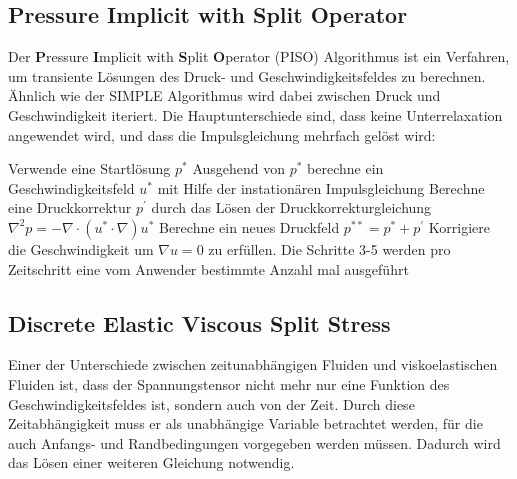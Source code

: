 \subsection{Pressure Implicit with Split Operator}
Der \textbf{P}ressure \textbf{I}mplicit with \textbf{S}plit \textbf{O}perator (PISO)  Algorithmus ist ein Verfahren, um transiente Lösungen des Druck- und Geschwindigkeitsfeldes zu berechnen.\\
Ähnlich wie der \mbox{SIMPLE} Algorithmus wird dabei zwischen Druck und Geschwindigkeit iteriert. Die Hauptunterschiede sind, dass keine Unterrelaxation angewendet wird, und dass die Impulsgleichung mehrfach gelöst wird:
\begin{outline}[enumerate]
    \1 Verwende eine Startlösung $p^*$
    \1 Ausgehend von $p^*$ berechne ein Geschwindigkeitsfeld $u^*$ mit Hilfe der instationären Impulsgleichung
    \1 Berechne eine Druckkorrektur $p^{'}$ durch das Lösen der Druckkorrekturgleichung $\nabla^2p=-\nabla \cdot \left( u^*\cdot\nabla \right)u^*$
    \1 Berechne ein neues Druckfeld $p^{**}=p^*+ p^{'}$
    \1 Korrigiere die Geschwindigkeit um $\nabla u=0$ zu erfüllen.
    \1 Die Schritte 3-5 werden pro Zeitschritt eine vom Anwender bestimmte Anzahl mal ausgeführt
\end{outline}

\subsection{Discrete Elastic Viscous Split Stress}
Einer der Unterschiede zwischen zeitunabhängigen Fluiden und viskoelastischen Fluiden ist, dass der Spannungstensor nicht mehr nur eine Funktion des Geschwindigkeitsfeldes ist, sondern auch von der Zeit. Durch diese Zeitabhängigkeit muss er als unabhängige Variable betrachtet werden, für die auch Anfangs- und Randbedingungen vorgegeben werden müssen. Dadurch wird das Lösen einer weiteren Gleichung notwendig.


